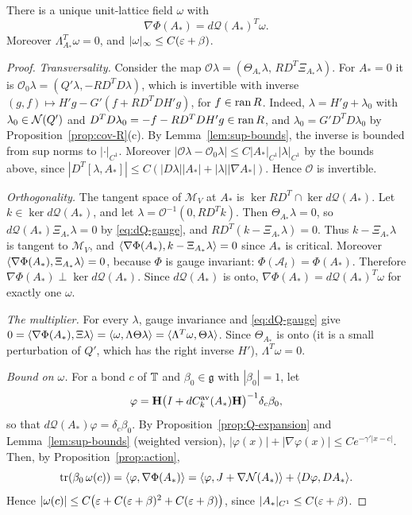 \begin{proposition}\label{prop:euler-lagrange}
There is a unique unit-lattice field $\omega$ with
\[
\nabla\Phi(A_*)=d\mathcal Q(A_*)^T\omega .
\]
Moreover $\Lambda_{A_*}^T\omega=0$, and $|\omega|_\infty\le C(\varepsilon+\beta)$.
\end{proposition}

\begin{proof}
\emph{Transversality.} Consider the map $\mathcal O\lambda=(\Theta_{A_*}\lambda,\,RD^T\Xi_{A_*}\lambda)$. For $A_*=0$ it is $\mathcal O_0\lambda=(Q'\lambda,-RD^TD\lambda)$, which is invertible with inverse $(g,f)\mapsto H'g-G'(f+RD^TDH'g)$, for $f\in\operatorname{ran} R$. Indeed, $\lambda=H'g+\lambda_0$ with $\lambda_0\in\mathcal N(Q')$ and $D^TD\lambda_0=-f-RD^TDH'g\in\operatorname{ran} R$, and $\lambda_0=G'D^TD\lambda_0$ by Proposition~\ref{prop:cov-R}(c). By Lemma~\ref{lem:sup-bounds}, the inverse is bounded from sup norms to $|\cdot|_{C^1}$. Moreover $|\mathcal O\lambda-\mathcal O_0\lambda|\le C|A_*|_{C^1}|\lambda|_{C^1}$ by the bounds above, since $|D^T[\lambda,A_*]|\le C(|D\lambda||A_*|+|\lambda||\nabla A_*|)$. Hence $\mathcal O$ is invertible.

\emph{Orthogonality.} The tangent space of $\mathcal M_V$ at $A_*$ is $\ker RD^T\cap\ker d\mathcal Q(A_*)$. Let $k\in\ker d\mathcal Q(A_*)$, and let $\lambda=\mathcal O^{-1}(0,RD^Tk)$. Then $\Theta_{A_*}\lambda=0$, so $d\mathcal Q(A_*)\Xi_{A_*}\lambda=0$ by \eqref{eq:dQ-gauge}, and $RD^T(k-\Xi_{A_*}\lambda)=0$. Thus $k-\Xi_{A_*}\lambda$ is tangent to $\mathcal M_V$, and $\langle \nabla\Phi(A_*),k-\Xi_{A_*}\lambda\rangle=0$ since $A_*$ is critical. Moreover $\langle \nabla\Phi(A_*),\Xi_{A_*}\lambda\rangle=0$, because $\Phi$ is gauge invariant: $\Phi(\mathcal A_t)=\Phi(A_*)$. Therefore $\nabla\Phi(A_*)\perp\ker d\mathcal Q(A_*)$. Since $d\mathcal Q(A_*)$ is onto, $\nabla\Phi(A_*)=d\mathcal Q(A_*)^T\omega$ for exactly one $\omega$.

\emph{The multiplier.} For every $\lambda$, gauge invariance and \eqref{eq:dQ-gauge} give $0=\langle \nabla\Phi(A_*),\Xi\lambda\rangle=\langle \omega,\Lambda\Theta\lambda\rangle=\langle \Lambda^T\omega,\Theta\lambda\rangle$. Since $\Theta_{A_*}$ is onto (it is a small perturbation of $Q'$, which has the right inverse $H'$), $\Lambda^T\omega=0$.

\emph{Bound on $\omega$.} For a bond $c$ of $\mathbb T$ and $\beta_0\in\mathfrak g$ with $|\beta_0|=1$, let
\[
\varphi=\mathbf H\big(I+dC^{\rm av}_k(A_*)\mathbf H\big)^{-1}\delta_c\beta_0 ,
\]
so that $d\mathcal Q(A_*)\varphi=\delta_c\beta_0$. By Proposition~\ref{prop:Q-expansion} and Lemma~\ref{lem:sup-bounds} (weighted version), $|\varphi(x)|+|\nabla\varphi(x)|\le Ce^{-\gamma'|x-c|}$. Then, by Proposition~\ref{prop:action},
\[
\operatorname{tr}(\beta_0\,\omega(c))=\langle \varphi,\nabla\Phi(A_*)\rangle=\langle \varphi,J+\nabla\mathcal N(A_*)\rangle+\langle D\varphi,DA_*\rangle.
\]
Hence $|\omega(c)|\le C\big(\varepsilon+C(\varepsilon+\beta)^2+C(\varepsilon+\beta)\big)$, since $|A_*|_{C^1}\le C(\varepsilon+\beta)$.
\end{proof}

